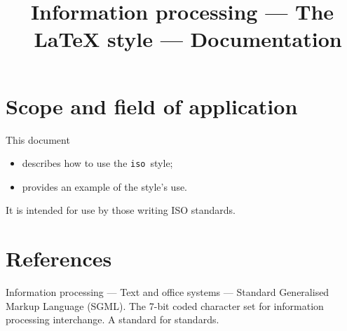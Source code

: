 

\title{Information processing --- The \iso\ LaTeX style --- Documentation}

\documenttype{}

\newcommand{\iso}{{\tt iso\/}}






\tableofcontents
\listoffigures
\listoftables



\maketitle

\section{Scope and field of application}
This document
\begin{itemize}
\item describes how to use the \iso\ style;
\item provides an example of the style's use.
\end{itemize}

It is intended for use by those writing ISO standards.

\section{References}
\label{references}
\begin{references}
 Information processing ---
    Text and office systems --- Standard
    Generalised Markup Language (SGML).
 The 7-bit coded character set for information
    processing interchange.
 A standard for standards.
\end{references}

